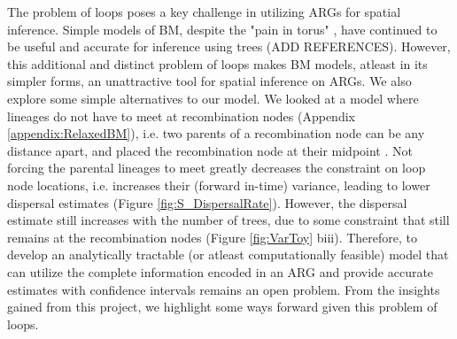 The problem of loops poses a key challenge in utilizing ARGs for spatial inference. Simple models of BM, despite the "pain in torus" \cite{Felsenstein1975}, have continued to be useful and accurate for inference using trees \cite{} (ADD REFERENCES). However, this additional and distinct problem of loops makes BM models, atleast in its simpler forms, an unattractive tool for spatial inference on ARGs. We also explore some simple alternatives to our model. We looked at a model where lineages do not have to meet at recombination nodes (Appendix \ref{appendix:RelaxedBM}), i.e. two parents of a recombination node can be any distance apart, and placed the recombination node at their midpoint \citep[an approach used for phenotypic evolution in phylogenetic networks][]{Bastide2018}. Not forcing the parental lineages to meet greatly decreases the constraint on loop node locations, i.e. increases their (forward in-time) variance, leading to lower dispersal estimates (Figure \ref{fig:S_DispersalRate}). However, the dispersal estimate still increases with the number of trees, due to some constraint that still remains at the recombination nodes (Figure \ref{fig:VarToy} biii). Therefore, to develop an analytically tractable (or atleast computationally feasible) model that can utilize the complete information encoded in an ARG and provide accurate estimates with confidence intervals remains an open problem. From the insights gained from this project, we highlight some ways forward given this problem of loops. 



